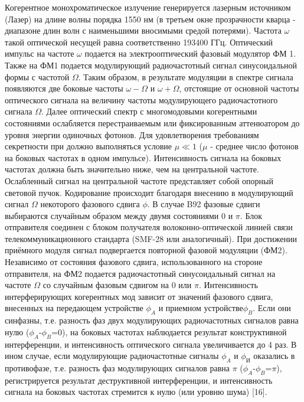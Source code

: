 Когерентное монохроматическое излучение генерируется лазерным источником (Лазер) на длине волны порядка 1550 нм (в третьем окне прозрачности кварца - диапазоне длин волн с наименьшими вносимыми средой потерями). Частота $\omega$ такой оптической несущей равна соответственно 193400 ГГц. Оптический импульс на частоте $\omega$ подается на электрооптический фазовый модулятор ФМ 1. Также на ФМ1 подается модулирующий радиочастотный сигнал синусоидальной формы с частотой $\Omega$. Таким образом, в результате модуляции в спектре сигнала появляются две боковые частоты $\omega-\Omega$ и $\omega+\Omega$, отстоящие от основной частоты оптического сигнала на величину частоты модулирующего радиочастотного сигнала $\Omega$. Далее оптический спектр с многомодовыми когерентными состояниями ослабляется перестраиваемым или фиксированным аттенюатором до уровня энергии одиночных фотонов. Для удовлетворения требованиям секретности при должно выполняться условие $\mu \ll 1$ ($\mu$ - среднее число фотонов на боковых частотах в одном импульсе). Интенсивность сигнала на боковых частотах должна быть значительно ниже, чем на центральной частоте. Ослабленный сигнал на центральной частоте представляет собой опорный световой пучок. Кодирование происходит благодаря внесению в модулирующий сигнал $\Omega$ некоторого фазового сдвига $\phi$. В случае B92 фазовые сдвиги выбираются случайным образом между двумя состояниями 0 и $\pi$. Блок отправителя соединен с блоком получателя волоконно-оптической линией связи телекоммуникационного стандарта (SMF-28 или аналогичный). При достижении приёмного модуля сигнал подвергается повторной фазовой модуляции (ФМ2). Независимо от состояния фазового сдвига, использованного на стороне отправителя, на ФМ2 подается радиочастотный синусоидальный сигнал на частоте $\Omega$ со случайным фазовым сдвигом на 0 или $\pi$. Интенсивность интерферирующих когерентных мод зависит от значений фазового сдвига, внесенных на передающем устройстве $\phi_A$ и приемном устройстве$\phi_B$. Если они синфазны, т.\:е. разность фаз двух модулирующих радиочастотных сигналов равна нулю ($\phi_A$-$\phi_B$=$0$), на боковых частотах наблюдается результат конструктивной интерференции, и интенсивность оптического сигнала увеличивается до 4 раз. В ином случае, если модулирующие радиочастотные сигналы $\phi_A$ и $\phi_И$ оказались в противофазе, т.\:е. разность фаз модулирующих сигналов равна $\pi$ ($\phi_A$-$\phi_B$=$\pi$), регистрируется результат деструктивной интерференции, и интенсивность сигнала на боковых частотах стремится к нулю (или уровню шума) [16]. 
 
